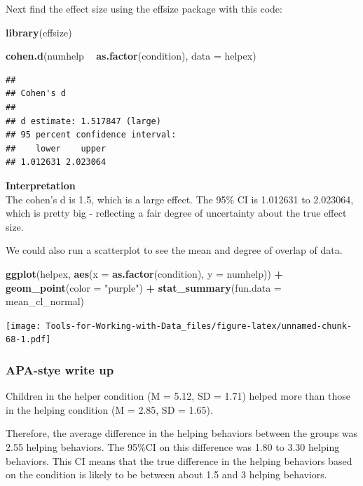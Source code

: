 \documentclass[
]{book}
\newenvironment{Shaded}{\begin{snugshade}}{\end{snugshade}}
\newcommand{\DataTypeTok}[1]{\textcolor[rgb]{0.13,0.29,0.53}{#1}}
\newcommand{\KeywordTok}[1]{\textcolor[rgb]{0.13,0.29,0.53}{\textbf{#1}}}
\newcommand{\NormalTok}[1]{#1}
\newcommand{\OperatorTok}[1]{\textcolor[rgb]{0.81,0.36,0.00}{\textbf{#1}}}
\newcommand{\StringTok}[1]{\textcolor[rgb]{0.31,0.60,0.02}{#1}}
\begin{document}
Next find the effect size using the effsize package with this code:

\begin{Shaded}
\begin{Highlighting}[]
\KeywordTok{library}\NormalTok{(effsize) }

\KeywordTok{cohen.d}\NormalTok{(numhelp }\OperatorTok{~}\StringTok{ }\KeywordTok{as.factor}\NormalTok{(condition), }\DataTypeTok{data =}\NormalTok{ helpex)}
\end{Highlighting}
\end{Shaded}

\begin{verbatim}
## 
## Cohen's d
## 
## d estimate: 1.517847 (large)
## 95 percent confidence interval:
##    lower    upper 
## 1.012631 2.023064
\end{verbatim}

\textbf{Interpretation}\\
The cohen's d is 1.5, which is a large effect. The 95\% CI is 1.012631 to 2.023064, which is pretty big - reflecting a fair degree of uncertainty about the true effect size.

We could also run a scatterplot to see the mean and degree of overlap of data.

\begin{Shaded}
\begin{Highlighting}[]
\KeywordTok{ggplot}\NormalTok{(helpex, }\KeywordTok{aes}\NormalTok{(}\DataTypeTok{x =} \KeywordTok{as.factor}\NormalTok{(condition), }\DataTypeTok{y =}\NormalTok{ numhelp)) }\OperatorTok{+}
\StringTok{  }\KeywordTok{geom_point}\NormalTok{(}\DataTypeTok{color =} \StringTok{"purple"}\NormalTok{) }\OperatorTok{+}
\StringTok{  }\KeywordTok{stat_summary}\NormalTok{(}\DataTypeTok{fun.data =}\NormalTok{ mean_cl_normal)}
\end{Highlighting}
\end{Shaded}

\texttt{[image: Tools-for-Working-with-Data\_files/figure-latex/unnamed-chunk-68-1.pdf]}

\hypertarget{apa-stye-write-up}{%
\subsubsection{APA-stye write up}\label{apa-stye-write-up}}

Children in the helper condition (M = 5.12, SD = 1.71) helped more than those in the helping condition (M = 2.85, SD = 1.65).

Therefore, the average difference in the helping behaviors between the groups was 2.55 helping behaviors. The 95\%CI on this difference was 1.80 to 3.30 helping behaviors. This CI means that the true difference in the helping behaviors based on the condition is likely to be between about 1.5 and 3 helping behaviors.
\end{document}

